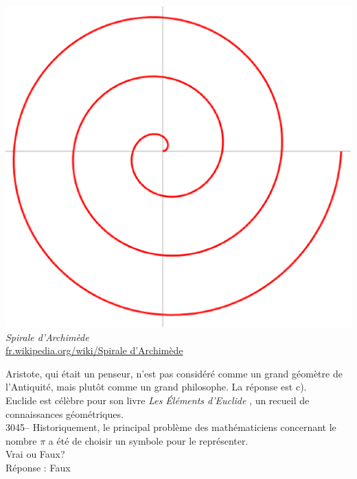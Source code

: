 \documentclass[letterpaper, 12pt]{article}
\begin{document}
\begin{center}
\includegraphics[scale=0.25]{spirale.eps}\\
\emph{{\small Spirale d'Archim\`ede}}\\
\href{http://fr.wikipedia.org/wiki/Spirale_d\%27Archim\%C3\%A8de}{fr.wikipedia.org/wiki/Spirale d'Archim\`ede}
\end{center}
Aristote, qui \'etait un penseur, n'est pas consid\'er\'e comme un grand g\'eom\`etre de l'Antiquit\'e, mais plut\^ot comme un grand philosophe.  La r\'eponse est c).\\
Euclide est c\'el\`ebre pour son livre \og \emph{Les \'El\'ements d'Euclide} \fg, un recueil de connaissances g\'eom\'etriques.\\



3045-- Historiquement, le principal probl\`eme des math\'ematiciens concernant le nombre $\pi$ a \'et\'e de choisir un symbole pour le repr\'esenter.\\
Vrai ou Faux?\\

R\'eponse : Faux\\
\end{document}
